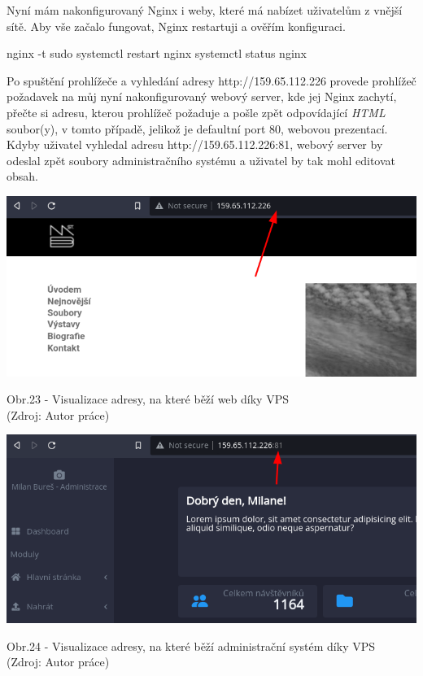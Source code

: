 \documentclass[12pt,a4paper]{report}
\begin{document}
  Nyní mám nakonfigurovaný Nginx i weby, které má nabízet uživatelům z vnější sítě.
  Aby vše začalo fungovat, Nginx restartuji a ověřím konfiguraci.
  \begin{bash}
    nginx -t
    sudo systemctl restart nginx
    systemctl status nginx
  \end{bash}

  Po spuštění prohlížeče a vyhledání adresy http://159.65.112.226 provede prohlížeč
  požadavek na můj nyní nakonfigurovaný webový server, kde jej Nginx zachytí, přečte si adresu, kterou prohlížeč požaduje a 
  pošle zpět odpovídající \emph{HTML} soubor(y), v tomto případě, jelikož je defaultní port 80, webovou prezentací.
  Kdyby uživatel vyhledal adresu http://159.65.112.226:81, webový server by odeslal zpět soubory administračního systému a uživatel by tak mohl editovat 
  obsah.

  \vspace*{0.5cm}
  \noindent\includegraphics[width=\linewidth]{VPS_WEB.png}
  \begin{center}
    Obr.23 - Visualizace adresy, na které běží web díky VPS \\
    (Zdroj: Autor práce)
  \end{center}
  \vspace*{0.5cm}
  \vspace*{0.5cm}
  \noindent\includegraphics[width=\linewidth]{VPS_CMS.png}
  \begin{center}
    Obr.24 - Visualizace adresy, na které běží administrační systém díky VPS \\
    (Zdroj: Autor práce)
  \end{center}
  \vspace*{0.5cm}
\end{document}

